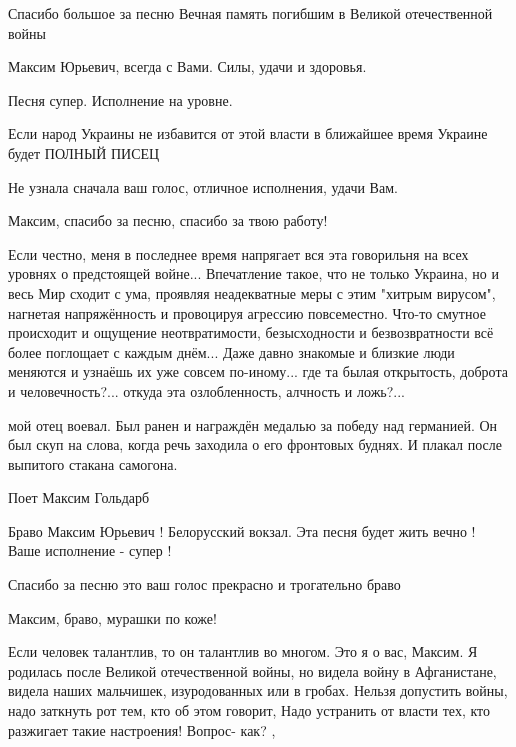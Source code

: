 \begin{itemize}
\begin{multicols}{2}

Спасибо большое за песню Вечная память погибшим в Великой отечественной войны

Максим Юрьевич, всегда с Вами. Силы, удачи и здоровья.

Песня супер. Исполнение на уровне.

Если народ Украины не избавится от этой власти в ближайшее время Украине будет ПОЛНЫЙ ПИСЕЦ

Не узнала сначала  ваш голос, отличное исполнения, удачи Вам.

Максим, спасибо за песню, спасибо за твою работу!


Если честно, меня в последнее время напрягает вся эта говорильня на всех
уровнях о предстоящей войне...  Впечатление такое, что не только Украина, но и
весь Мир сходит с ума, проявляя неадекватные меры с этим "хитрым вирусом",
нагнетая напряжённость и провоцируя агрессию повсеместно. Что-то смутное
происходит и ощущение неотвратимости, безысходности и безвозвратности всё более
поглощает с каждым днём...  Даже давно знакомые и близкие люди меняются и
узнаёшь их уже совсем  по-иному...  где та былая открытость, доброта и
человечность?...  откуда эта озлобленность, алчность и ложь?...


мой отец воевал. Был ранен и награждён медалью за победу над германией. Он был
скуп на слова, когда речь заходила о его фронтовых буднях. И плакал после
выпитого стакана самогона.

Поет Максим Гольдарб


Браво Максим Юрьевич ! Белорусский вокзал. Эта песня будет жить вечно ! Ваше исполнение - супер !


Спасибо за песню это ваш голос прекрасно и трогательно браво

Максим, браво, мурашки по коже!


Если человек талантлив, то он талантлив во многом.  Это я о вас, Максим. Я
родилась  после  Великой отечественной войны, но видела войну в  Афганистане,
видела наших мальчишек, изуродованных или в гробах. Нельзя  допустить войны, надо
заткнуть рот тем, кто об этом говорит, Надо устранить от власти тех, кто
разжигает такие настроения! Вопрос- как?  ,


\end{multicols}
\end{itemize}
